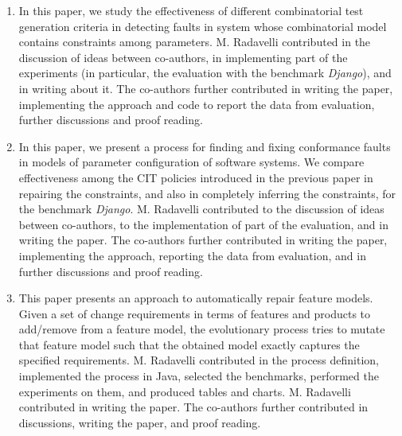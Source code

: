 \begin{enumerate}
	\renewcommand{\theenumi}{\Alph{enumi}} %
	\item \cite{Gargantini16:validation} 
	
	In this paper, we study the effectiveness of different combinatorial test generation criteria in detecting faults in system whose combinatorial model contains constraints among parameters.
	M. Radavelli contributed in the discussion of ideas between co-authors, in implementing part of the experiments (in particular, the evaluation with the benchmark \textit{Django}), and in writing about it.
	The co-authors further contributed in writing the paper, implementing the approach and code to report the data from evaluation, further discussions and proof reading.

	\item \cite{gargantini_combinatorial_2017} 

	In this paper, we present a process for finding and fixing conformance faults in models of parameter configuration of software systems. We compare effectiveness among the CIT policies introduced in the previous paper \cite{Gargantini16:validation} in repairing the constraints, and also in completely inferring the constraints, for the benchmark \textit{Django}.
	M. Radavelli contributed to the discussion of ideas between co-authors, to the implementation of part of the evaluation, and in writing the paper.
	The co-authors further contributed in writing the paper, implementing the approach, reporting the data from evaluation, and in further discussions and proof reading.
		
	\item \cite{arcaini_evolutionary_2018} 
	
	This paper presents an approach to automatically repair feature models. Given a set of change requirements in terms of features and products to add/remove from a feature model, the evolutionary process tries to mutate that feature model such that the obtained model exactly captures the specified requirements.
	M. Radavelli contributed in the process definition, implemented the process in Java, selected the benchmarks, performed the experiments on them, and produced tables and charts. M. Radavelli contributed in writing the paper.
	The co-authors further contributed in discussions, writing the paper, and proof reading.


\end{enumerate}
